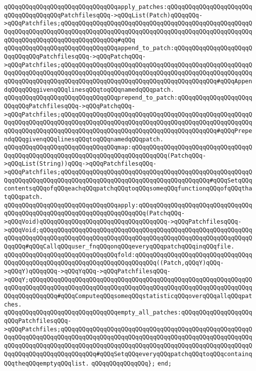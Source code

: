 \verb|qQQqqQQqqQQqqQQqqQQqqQQqqQQqqQQqapply_patches:qQQqqQQqqQQqqQQqqQQqqQQqqQQqqQQqqQQqqQQqPatchfilesqQQq->qQQqList(Patch)qQQqqQQq->qQQqPatchfiles;qQQqqQQqqQQqqQQqqQQqqQQqqQQqqQQqqQQqqQQqqQQqqQQqqQQqqQQqqQQqqQQqqQQqqQQqqQQqqQQqqQQqqQQqqQQqqQQqqQQqqQQqqQQqqQQqqQQqqQQqqQQqqQQqqQQqqQQqqQQqqQQqqQQqqQQqqQQq#qQQq|\newline
\newline
\verb|qQQqqQQqqQQqqQQqqQQqqQQqqQQqqQQqappend_to_patch:qQQqqQQqqQQqqQQqqQQqqQQqqQQqqQQqPatchfilesqQQq->qQQqPatchqQQq->qQQqPatchfiles;qQQqqQQqqQQqqQQqqQQqqQQqqQQqqQQqqQQqqQQqqQQqqQQqqQQqqQQqqQQqqQQqqQQqqQQqqQQqqQQqqQQqqQQqqQQqqQQqqQQqqQQqqQQqqQQqqQQqqQQqqQQqqQQqqQQqqQQqqQQqqQQqqQQqqQQqqQQqqQQqqQQqqQQqqQQqqQQqqQQqqQQq#qQQqAppendqQQqqQQqgivenqQQqlinesqQQqtoqQQqnamedqQQqpatch.|\newline
\verb|qQQqqQQqqQQqqQQqqQQqqQQqqQQqqQQqprepend_to_patch:qQQqqQQqqQQqqQQqqQQqqQQqqQQqPatchfilesqQQq->qQQqPatchqQQq->qQQqPatchfiles;qQQqqQQqqQQqqQQqqQQqqQQqqQQqqQQqqQQqqQQqqQQqqQQqqQQqqQQqqQQqqQQqqQQqqQQqqQQqqQQqqQQqqQQqqQQqqQQqqQQqqQQqqQQqqQQqqQQqqQQqqQQqqQQqqQQqqQQqqQQqqQQqqQQqqQQqqQQqqQQqqQQqqQQqqQQqqQQqqQQqqQQq#qQQqPrependqQQqgivenqQQqlinesqQQqtoqQQqnamedqQQqpatch.|\newline
\newline
\verb|qQQqqQQqqQQqqQQqqQQqqQQqqQQqqQQqmap:qQQqqQQqqQQqqQQqqQQqqQQqqQQqqQQqqQQqqQQqqQQqqQQqqQQqqQQqqQQqqQQqqQQqqQQqqQQqqQQq(PatchqQQq->qQQqList(String))qQQq->qQQqPatchfilesqQQq->qQQqPatchfiles;qQQqqQQqqQQqqQQqqQQqqQQqqQQqqQQqqQQqqQQqqQQqqQQqqQQqqQQqqQQqqQQqqQQqqQQqqQQqqQQqqQQqqQQqqQQqqQQqqQQqqQQqqQQqqQQq#qQQqSetqQQqcontentsqQQqofqQQqeachqQQqpatchqQQqtoqQQqsomeqQQqfunctionqQQqofqQQqthatqQQqpatch.|\newline
\verb|qQQqqQQqqQQqqQQqqQQqqQQqqQQqqQQqapply:qQQqqQQqqQQqqQQqqQQqqQQqqQQqqQQqqQQqqQQqqQQqqQQqqQQqqQQqqQQqqQQqqQQqqQQq(PatchqQQq->qQQqVoid)qQQqqQQqqQQqqQQqqQQqqQQqqQQqqQQqqQQq->qQQqPatchfilesqQQq->qQQqVoid;qQQqqQQqqQQqqQQqqQQqqQQqqQQqqQQqqQQqqQQqqQQqqQQqqQQqqQQqqQQqqQQqqQQqqQQqqQQqqQQqqQQqqQQqqQQqqQQqqQQqqQQqqQQqqQQqqQQqqQQqqQQqqQQqqQQqqQQq#qQQqCallqQQquser_fnqQQqonqQQqeveryqQQqpatchqQQqinqQQqfile.|\newline
\verb|qQQqqQQqqQQqqQQqqQQqqQQqqQQqqQQqfold:qQQqqQQqqQQqqQQqqQQqqQQqqQQqqQQqqQQqqQQqqQQqqQQqqQQqqQQqqQQqqQQqqQQqqQQqqQQq((Patch,qQQqY)qQQq->qQQqY)qQQqqQQq->qQQqYqQQq->qQQqPatchfilesqQQq->qQQqY;qQQqqQQqqQQqqQQqqQQqqQQqqQQqqQQqqQQqqQQqqQQqqQQqqQQqqQQqqQQqqQQqqQQqqQQqqQQqqQQqqQQqqQQqqQQqqQQqqQQqqQQqqQQqqQQqqQQqqQQqqQQqqQQqqQQqqQQqqQQqqQQqqQQq#qQQqComputeqQQqsomeqQQqstatisticqQQqoverqQQqallqQQqpatches.|\newline
\newline
\verb|qQQqqQQqqQQqqQQqqQQqqQQqqQQqqQQqempty_all_patches:qQQqqQQqqQQqqQQqqQQqqQQqPatchfilesqQQq->qQQqPatchfiles;qQQqqQQqqQQqqQQqqQQqqQQqqQQqqQQqqQQqqQQqqQQqqQQqqQQqqQQqqQQqqQQqqQQqqQQqqQQqqQQqqQQqqQQqqQQqqQQqqQQqqQQqqQQqqQQqqQQqqQQqqQQqqQQqqQQqqQQqqQQqqQQqqQQqqQQqqQQqqQQqqQQqqQQqqQQqqQQqqQQqqQQqqQQqqQQqqQQqqQQqqQQqqQQqqQQqqQQqqQQq#qQQqSetqQQqeveryqQQqpatchqQQqtoqQQqcontainqQQqtheqQQqemptyqQQqlist.|\newline
\verb|qQQqqQQqqQQqqQQq};|\newline
\verb|end;|\newline
\newline


